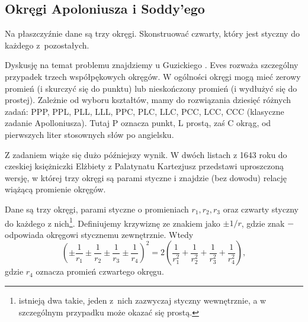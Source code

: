 %

\subsection{Okręgi Apoloniusza i Soddy'ego}

\begin{problem}
    \label{problem_apolloniusza}%
    Na płaszczyźnie dane są trzy okręgi.
    Skonstruować czwarty, który jest styczny do każdego z~pozostałych.
\end{problem}

Dyskusję na temat problemu znajdziemy u Guzickiego \cite[s. 444-461]{guzicki_2021}.
Eves \cite[s. 164]{eves1_1972} rozważa szczególny przypadek trzech współpękowych okręgów.
W ogólności okręgi mogą mieć zerowy promień (i skurczyć się do punktu) lub nieskończony promień (i wydłużyć się do prostej).
Zależnie od wyboru kształtów, mamy do rozwiązania dziesięć różnych zadań: PPP, PPL, PLL, LLL, PPC, PLC, LLC, PCC, LCC, CCC (klasyczne zadanie Apolloniusza).
Tutaj P oznacza punkt, L prostą, zaś C okrąg, od pierwszych liter stosownych słów po angielsku.

Z zadaniem wiąże się dużo późniejszy wynik.
W dwóch listach z 1643 roku do czeskiej księżniczki Elżbiety z Palatynatu Kartezjusz przedstawi uproszczoną wersję, w której trzy okręgi są parami styczne i znajdzie (bez dowodu) relację wiążącą promienie okręgów.

\begin{theorem}[Kartezjusza]
    Dane są trzy okręgi, parami styczne o promieniach $r_1, r_2, r_3$ oraz czwarty styczny do każdego z nich\footnote{istnieją dwa takie, jeden z~nich zazwyczaj styczny wewnętrznie, a w szczególnym przypadku może okazać się prostą.}.
    Definiujemy krzywiznę ze znakiem jako $\pm 1 / r$, gdzie znak $-$ odpowiada okręgowi stycznemu zewnętrznie.
    Wtedy
    \begin{equation}
        \left(\pm \frac{1}{r_1} \pm  \frac{1}{r_2} \pm  \frac{1}{r_3} \pm  \frac{1}{r_4}\right)^2 = 2 \left(\frac{1}{r_1^2} + \frac{1}{r_2^2} + \frac{1}{r_3^2} + \frac{1}{r_4^2}\right),
    \end{equation}
    gdzie $r_4$ oznacza promień czwartego okręgu.
\end{theorem}


